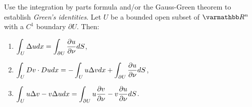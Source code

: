 \documentclass[10pt,oneside,openany]{memoir}
\begin{document}
\newpage
\begin{problem}[manual-num={4}]
    Use the integration by parts formula and/or the Gauss-Green theorem to establish \textit{Green's identities}. Let $U$ be a bounded open subset of $\bfR^n$ with a $C^1$ boundary $\partial U$. Then:
    \begin{enumerate}[label = (\alph*),itemsep=1pt,topsep=3pt]
        \item $\displaystyle \int_U \Delta u dx = \int_{\partial U}\frac{\partial u}{\partial \nu}dS$,
        \item $\displaystyle \int_U Dv \cdot Du dx = -\int_U u\Delta v dx + \int_{\partial U}\frac{\partial u}{\partial \nu}dS$, 
        \item $\displaystyle \int_U u \Delta v - v \Delta u dx = \int_{\partial U} u\frac{\partial v}{\partial \nu} - v \frac{\partial u}{\partial \nu}dS$.
    \end{enumerate}
\end{problem}
\end{document}
